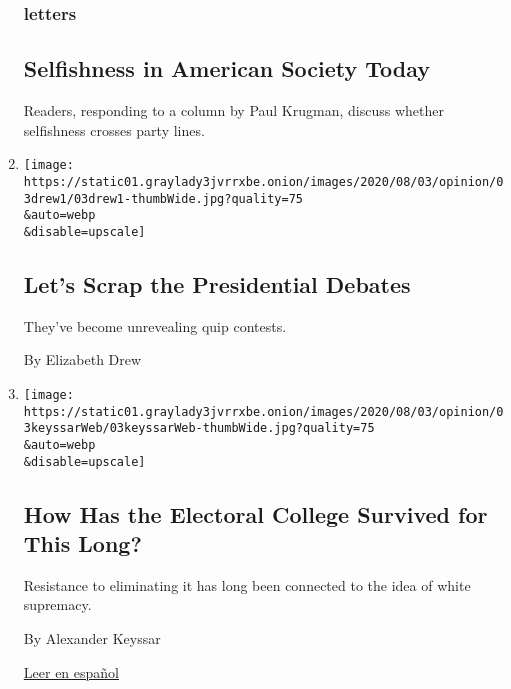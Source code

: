 \begin{enumerate}
  \hypertarget{letters-3}{%
  \subsubsection{letters}\label{letters-3}}

  \hypertarget{selfishness-in-american-society-today}{%
  \subsection{Selfishness in American Society
  Today}\label{selfishness-in-american-society-today}}

  Readers, responding to a column by Paul Krugman, discuss whether
  selfishness crosses party lines.
\item
  \href{/2020/08/03/opinion/trump-biden-presidential-debates-2020.html}{}

  \texttt{[image: https://static01.graylady3jvrrxbe.onion/images/2020/08/03/opinion/03drew1/03drew1-thumbWide.jpg?quality=75\\\&auto=webp\\\&disable=upscale]}

  \hypertarget{lets-scrap-the-presidential-debates}{%
  \subsection{Let's Scrap the Presidential
  Debates}\label{lets-scrap-the-presidential-debates}}

  They've become unrevealing quip contests.

  By Elizabeth Drew
\item
  \href{/2020/08/03/opinion/electoral-college-racism-white-supremacy.html}{}

  \texttt{[image: https://static01.graylady3jvrrxbe.onion/images/2020/08/03/opinion/03keyssarWeb/03keyssarWeb-thumbWide.jpg?quality=75\\\&auto=webp\\\&disable=upscale]}

  \hypertarget{how-has-the-electoral-college-survived-for-this-long}{%
  \subsection{How Has the Electoral College Survived for This
  Long?}\label{how-has-the-electoral-college-survived-for-this-long}}

  Resistance to eliminating it has long been connected to the idea of
  white supremacy.

  By Alexander Keyssar

  \href{https://www.nytimes3xbfgragh.onion/es/2020/08/03/espanol/opinion/colegio-electoral-estados-unidos.html}{Leer
  en español}
\end{enumerate}

